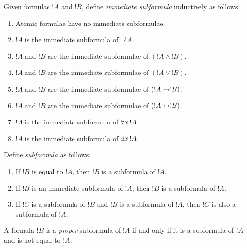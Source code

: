 \documentclass[open-logic-section]{subfiles}
\begin{document}
\begin{defn}
Given formulae $!A$ and $!B$, define \emph{immediate subformula} inductively as follows:
\begin{enumerate}
\item Atomic formulae have no immediate subformulae.
\item $!A$ is the immediate subformula of $\lnot !A$.
\item $!A$ and $!B$ are the immediate subformulae of $(!A \land !B)$.
\item $!A$ and $!B$ are the immediate subformulae of $(!A \lor !B)$.
\item $!A$ and $!B$ are the immediate subformulae of $(!A \to !B)$.
\item $!A$ and $!B$ are the immediate subformulae of $(!A \leftrightarrow !B)$.
\item $!A$ is the immediate subformula of $\lforall[x][!A]$.
\item $!A$ is the immediate subformula of $\lexists[x][!A]$.
\end{enumerate}
\end{defn}


\begin{defn}[Subformula]
Define \emph{subformula} as follows:
\begin{enumerate}
\item If $!B$ is equal to $!A$, then $!B$ is a subformula of $!A$.
\item If $!B$ is an immediate subformula of $!A$, then $!B$ is a
  subformula of $!A$.
\item If $!C$ is a subformula of $!B$ and $!B$ is a subformula of
  $!A$, then $!C$ is also a subformula of $!A$.
\end{enumerate}
A formula $!B$ is a \emph{proper} subformula of $!A$ if and only if it
is a subformula of $!A$ and is not equal to $!A$.
\end{defn}

\end{document}
